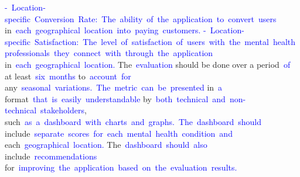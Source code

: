 \documentclass{article}
\begin{document}
\begin{tcolorbox}[colframe=black,colback=white]
{}\textcolor{blue}{-}\textcolor{blue}{~Location}\textcolor{blue}{-specific}\textcolor{blue}{~Conversion}\textcolor{blue}{~Rate}\textcolor{blue}{:}\textcolor{blue}{~The}\textcolor{blue}{~ability}\textcolor{blue}{~of}\textcolor{blue}{~the}\textcolor{blue}{~application}\textcolor{blue}{~to}\textcolor{blue}{~convert}\textcolor{blue}{~users} in\textcolor{blue}{~each}\textcolor{blue}{~geographical}\textcolor{blue}{~location}\textcolor{blue}{~into}\textcolor{blue}{~paying}\textcolor{blue}{~customers}\textcolor{blue}{.
}\textcolor{blue}{-}\textcolor{blue}{~Location}\textcolor{blue}{-specific}\textcolor{blue}{~Satisfaction}\textcolor{blue}{:}\textcolor{blue}{~The}\textcolor{blue}{~level}\textcolor{blue}{~of}\textcolor{blue}{~satisfaction}\textcolor{blue}{~of}\textcolor{blue}{~users}\textcolor{blue}{~with}\textcolor{blue}{~the}\textcolor{blue}{~mental}\textcolor{blue}{~health}\textcolor{blue}{~professionals}\textcolor{blue}{~they}\textcolor{blue}{~connect}\textcolor{blue}{~with}\textcolor{blue}{~through}\textcolor{blue}{~the}\textcolor{blue}{~application} in\textcolor{blue}{~each}\textcolor{blue}{~geographical}\textcolor{blue}{~location}\textcolor{blue}{.
}The\textcolor{blue}{~evaluation} should be done over a period\textcolor{blue}{~of} at least\textcolor{blue}{~six}\textcolor{blue}{~months} to\textcolor{blue}{~account}\textcolor{blue}{~for} any\textcolor{blue}{~seasonal}\textcolor{blue}{~variations}\textcolor{blue}{.}\textcolor{blue}{~The}\textcolor{blue}{~metric}\textcolor{blue}{~can}\textcolor{blue}{~be}\textcolor{blue}{~presented} in\textcolor{blue}{~a} format\textcolor{blue}{~that}\textcolor{blue}{~is}\textcolor{blue}{~easily}\textcolor{blue}{~understandable} by\textcolor{blue}{~both}\textcolor{blue}{~technical}\textcolor{blue}{~and}\textcolor{blue}{~non}\textcolor{blue}{-}\textcolor{blue}{technical}\textcolor{blue}{~stakeholders}, such\textcolor{blue}{~as}\textcolor{blue}{~a}\textcolor{blue}{~dashboard}\textcolor{blue}{~with}\textcolor{blue}{~charts}\textcolor{blue}{~and}\textcolor{blue}{~graphs}\textcolor{blue}{.}\textcolor{blue}{~The}\textcolor{blue}{~dashboard}\textcolor{blue}{~should} include\textcolor{blue}{~separate}\textcolor{blue}{~scores}\textcolor{blue}{~for}\textcolor{blue}{~each}\textcolor{blue}{~mental}\textcolor{blue}{~health}\textcolor{blue}{~condition}\textcolor{blue}{~and} each\textcolor{blue}{~geographical}\textcolor{blue}{~location}\textcolor{blue}{.} The\textcolor{blue}{~dashboard}\textcolor{blue}{~should}\textcolor{blue}{~also} include\textcolor{blue}{~recommendations} for\textcolor{blue}{~improving}\textcolor{blue}{~the}\textcolor{blue}{~application}\textcolor{blue}{~based}\textcolor{blue}{~on}\textcolor{blue}{~the}\textcolor{blue}{~evaluation}\textcolor{blue}{~results}\textcolor{blue}{.}\textcolor{blue}{}
\end{tcolorbox}
\end{document}
